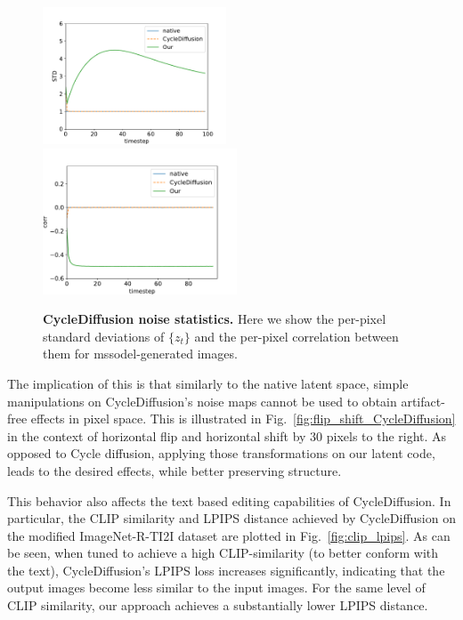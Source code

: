\begin{figure}[H]
\includegraphics[width=0.485\textwidth, trim={0.8cm 0cm 1.2cm 0cm},clip]{ICCV23_submission/figures/std_with_cycle_native.pdf}
\includegraphics[width=0.515\textwidth, trim={0cm 0cm 1.2cm 0cm},clip]{ICCV23_submission/figures/corr_with_cycle_native.pdf}
\caption{\textbf{CycleDiffusion noise statistics.} Here we show the per-pixel standard deviations of $\{z_t\}$ and the per-pixel correlation between them for mssodel-generated images.}
\label{fig:statistics_images_CycleDiffusion}
\end{figure}

\vspace{-4.cm}
The implication of this is that similarly to the native latent space, simple manipulations on CycleDiffusion's noise maps cannot be used to obtain artifact-free effects in pixel space. This is illustrated in Fig.~\ref{fig:flip_shift_CycleDiffusion} in the context of horizontal flip and horizontal shift by 30 pixels to the right. As opposed to Cycle diffusion, applying those transformations on our latent code, leads to the desired effects, while better preserving structure.%

\vspace{-0.2cm}
This behavior also affects the text based editing capabilities of CycleDiffusion. In particular, the CLIP similarity and LPIPS distance achieved by CycleDiffusion on the modified ImageNet-R-TI2I dataset are plotted in Fig.~\ref{fig:clip_lpips}. As can be seen, when tuned to achieve a high CLIP-similarity (\ie to better conform with the text), CycleDiffusion's LPIPS loss increases significantly, indicating that the output images become less similar to the input images. For the same level of CLIP similarity, our approach achieves a substantially lower LPIPS distance.

